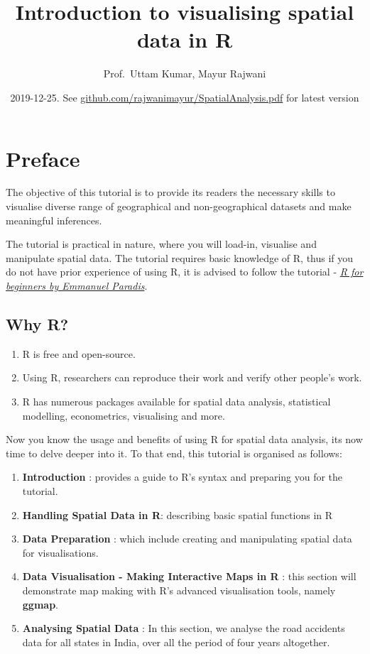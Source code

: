 \documentclass[]{article}
\title{Introduction to visualising spatial data in R}
\author{Prof.~Uttam Kumar, Mayur Rajwani}
\date{2019-12-25. See
\href{https://github.com/rajwanimayur/SpatialAnalysis}{github.com/rajwanimayur/SpatialAnalysis.pdf}
for latest version}
\providecommand{\tightlist}{%
  \setlength{\itemsep}{0pt}\setlength{\parskip}{0pt}}
\begin{document}
\maketitle

{
\setcounter{tocdepth}{2}
\tableofcontents
}
\hypertarget{preface}{%
\section{Preface}\label{preface}}

The objective of this tutorial is to provide its readers the necessary
skills to visualise diverse range of geographical and non-geographical
datasets and make meaningful inferences.

The tutorial is practical in nature, where you will load-in, visualise
and manipulate spatial data. The tutorial requires basic knowledge of R,
thus if you do not have prior experience of using R, it is advised to
follow the tutorial -
\href{https://cran.r-project.org/doc/contrib/Paradis-rdebuts_en.pdf}{\emph{R
for beginners by Emmanuel Paradis}}.

\hypertarget{why-r}{%
\subsection{Why R?}\label{why-r}}

\begin{enumerate}
\def\labelenumi{\arabic{enumi}.}
\tightlist
\item
  R is free and open-source.
\item
  Using R, researchers can reproduce their work and verify other
  people's work.
\item
  R has numerous packages available for spatial data analysis,
  statistical modelling, econometrics, visualising and more.
\end{enumerate}

Now you know the usage and benefits of using R for spatial data
analysis, its now time to delve deeper into it. To that end, this
tutorial is organised as follows:

\begin{enumerate}
\def\labelenumi{\arabic{enumi}.}
\tightlist
\item
  \textbf{Introduction} : provides a guide to R's syntax and preparing
  you for the tutorial.
\item
  \textbf{Handling Spatial Data in R}: describing basic spatial
  functions in R
\item
  \textbf{Data Preparation} : which include creating and manipulating
  spatial data for visualisations.
\item
  \textbf{Data Visualisation - Making Interactive Maps in R} : this
  section will demonstrate map making with R's advanced visualisation
  tools, namely \textbf{ggmap}.
\item
  \textbf{Analysing Spatial Data} : In this section, we analyse the road
  accidents data for all states in India, over all the period of four
  years altogether.
\end{enumerate}
\end{document}
